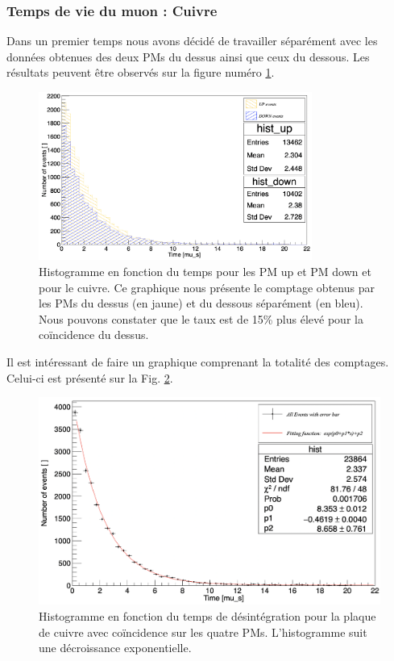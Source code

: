 \documentclass[12pt]{article}
\begin{document}
\subsubsection{Temps de vie du muon : Cuivre}

Dans un premier temps nous avons décidé de travailler séparément avec les données obtenues des deux PMs du dessus ainsi que ceux du dessous. Les résultats peuvent être observés sur la figure numéro \ref{fig:comptage_cuivre_up_down_separement}.

\begin{figure}[htpb!]
    \centering
    \includegraphics[width=0.8\textwidth]{graphiques/experience1/cuivre/comptage_cuivre_up_down_separement.png}
    \caption{Histogramme en fonction du temps pour les PM up et PM down et pour le cuivre. Ce graphique nous présente le comptage obtenus par les PMs du dessus (en jaune) et du dessous séparément (en bleu). Nous pouvons constater que le taux est de 15\% plus élevé pour la coïncidence du dessus.}
    \label{fig:comptage_cuivre_up_down_separement}
\end{figure}

Il est intéressant de faire un graphique comprenant la totalité des comptages. Celui-ci est présenté sur la Fig. \ref{fig:comptage_total_cuivre}.

\begin{figure}[htpb!]
    \centering
    \includegraphics[width=\textwidth]{graphiques/experience1/cuivre/comptage_total_cuivre.png}
    \caption{Histogramme en fonction du temps de désintégration pour la plaque de cuivre avec coïncidence sur les quatre PMs. L'histogramme suit une décroissance exponentielle.}
    \label{fig:comptage_total_cuivre}
\end{figure}
\end{document}
